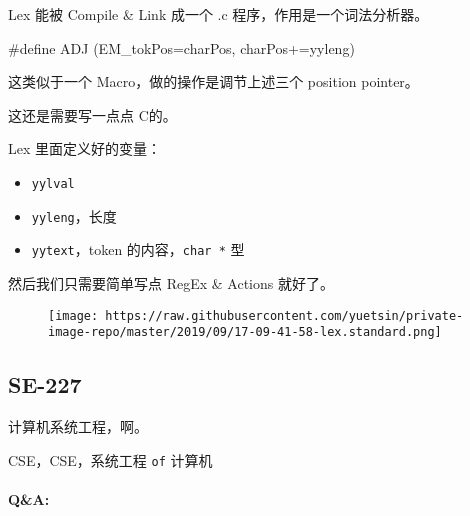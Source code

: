 \documentclass[
]{article}
\newenvironment{Shaded}{}{}
\newcommand{\PreprocessorTok}[1]{\textcolor[rgb]{0.74,0.48,0.00}{#1}}
\begin{document}
Lex 能被 Compile \& Link 成一个 .c 程序，作用是一个词法分析器。

\begin{Shaded}
\begin{Highlighting}[]
\PreprocessorTok{#define ADJ (EM_tokPos=charPos, charPos+=yyleng)}
\end{Highlighting}
\end{Shaded}

这类似于一个 Macro，做的操作是调节上述三个 position pointer。

这还是需要写一点点 C的。

Lex 里面定义好的变量：

\begin{itemize}
\item
  \texttt{yylval}
\item
  \texttt{yyleng}，长度
\item
  \texttt{yytext}，token 的内容，\texttt{char\ *} 型
\end{itemize}

然后我们只需要简单写点 RegEx \& Actions 就好了。

\begin{figure}
\centering
\texttt{[image: https://raw.githubusercontent.com/yuetsin/private-image-repo/master/2019/09/17-09-41-58-lex.standard.png]}
\caption{}
\end{figure}

\hypertarget{header-n129}{%
\subsection{SE-227}\label{header-n129}}

计算机系统工程，啊。

CSE，CSE，系统工程 \texttt{of} 计算机

\hypertarget{header-n132}{%
\paragraph{Q\&A:}\label{header-n132}}
\end{document}
